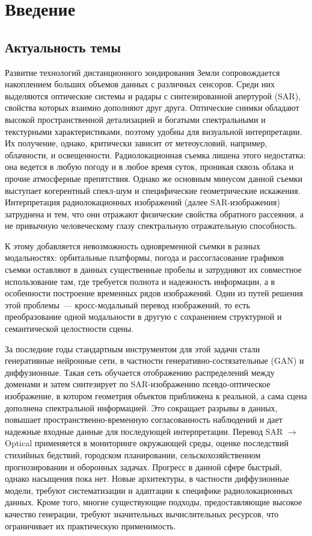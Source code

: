 \chapter{Введение}
\label{sec:Chapter0} 

\section{Актуальность темы}

Развитие технологий дистанционного зондирования Земли сопровождается накоплением больших объемов данных с различных сенсоров.
Среди них выделяются оптические системы и радары с синтезированной апертурой (SAR), свойства которых взаимно дополняют друг друга.
Оптические снимки обладают высокой пространственной детализацией и богатыми спектральными и текстурными характеристиками, поэтому удобны для визуальной интерпретации.
Их получение, однако, критически зависит от метеоусловий, например, облачности, и освещенности.
Радиолокационная съемка лишена этого недостатка: она ведется в любую погоду и в любое время суток, проникая сквозь облака и прочие атмосферные препятствия.
Однако же основным минусом данной съемки выступает когерентный спекл-шум и специфические геометрические искажения.
Интерпретация радиолокационных изображений (далее SAR-изображения) затруднена и тем, что они отражают физические свойства обратного рассеяния, а не привычную человеческому глазу спектральную отражательную способность.

К этому добавляется невозможность одновременной съемки в разных модальностях: орбитальные платформы, погода и рассогласование графиков съемки оставляют в данных существенные пробелы и затрудняют их совместное использование там, где требуется полнота и надежность информации, а в особенности построение временных рядов изображений.
Один из путей решения этой проблемы~--- кросс-модальный перевод изображений, то есть преобразование одной модальности в другую с сохранением структурной и семантической целостности сцены.

За последние годы стандартным инструментом для этой задачи стали генеративные нейронные сети, в частности генеративно-состязательные (GAN) и диффузионные.
Такая сеть обучается отображению распределений между доменами и затем синтезирует по SAR-изображению псевдо-оптическое изображение, в котором геометрия объектов приближена к реальной, а сама сцена дополнена спектральной информацией.
Это сокращает разрывы в данных, повышает пространственно-временную согласованность наблюдений и дает надежные входные данные для последующей интерпретации.
Перевод SAR $\to$ Optical применяется в мониторинге окружающей среды, оценке последствий стихийных бедствий, городском планировании, сельскохозяйственном прогнозировании и оборонных задачах.
Прогресс в данной сфере быстрый, однако насыщения пока нет.
Новые архитектуры, в частности диффузионные модели, требуют систематизации и адаптации к специфике радиолокационных данных.
Кроме того, многие существующие подходы, предоставляющие высокое качество генерации, требуют значительных вычислительных ресурсов, что ограничивает их практическую применимость.

